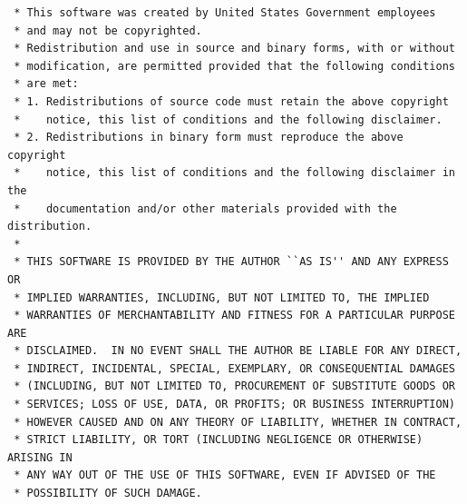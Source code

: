 \documentclass[titlepage]{article}
\begin{document}
\begin{verbatim}
 * This software was created by United States Government employees
 * and may not be copyrighted.
 * Redistribution and use in source and binary forms, with or without
 * modification, are permitted provided that the following conditions
 * are met:
 * 1. Redistributions of source code must retain the above copyright
 *    notice, this list of conditions and the following disclaimer.
 * 2. Redistributions in binary form must reproduce the above copyright
 *    notice, this list of conditions and the following disclaimer in the
 *    documentation and/or other materials provided with the distribution.
 *
 * THIS SOFTWARE IS PROVIDED BY THE AUTHOR ``AS IS'' AND ANY EXPRESS OR
 * IMPLIED WARRANTIES, INCLUDING, BUT NOT LIMITED TO, THE IMPLIED
 * WARRANTIES OF MERCHANTABILITY AND FITNESS FOR A PARTICULAR PURPOSE ARE
 * DISCLAIMED.  IN NO EVENT SHALL THE AUTHOR BE LIABLE FOR ANY DIRECT,
 * INDIRECT, INCIDENTAL, SPECIAL, EXEMPLARY, OR CONSEQUENTIAL DAMAGES
 * (INCLUDING, BUT NOT LIMITED TO, PROCUREMENT OF SUBSTITUTE GOODS OR
 * SERVICES; LOSS OF USE, DATA, OR PROFITS; OR BUSINESS INTERRUPTION)
 * HOWEVER CAUSED AND ON ANY THEORY OF LIABILITY, WHETHER IN CONTRACT,
 * STRICT LIABILITY, OR TORT (INCLUDING NEGLIGENCE OR OTHERWISE) ARISING IN
 * ANY WAY OUT OF THE USE OF THIS SOFTWARE, EVEN IF ADVISED OF THE
 * POSSIBILITY OF SUCH DAMAGE.
\end{verbatim}
\end{document}
